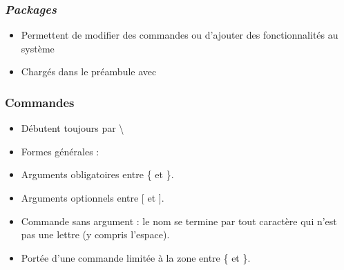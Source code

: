
\begin{frame}[c,fragile]

	\frametitle{\emph{Packages}}
	
	\begin{itemize}
		\item Permettent de modifier des commandes ou d’ajouter des	fonctionnalités au système
		\item Chargés dans le préambule avec
		
	\begin{codesource}
	\usepackage{package}
	\usepackage[options]{package}
	\usepackage{package1,package2,...}
	\end{codesource}
	\end{itemize}
\end{frame}


\begin{frame}[fragile]

	\frametitle{Commandes}
	
	\begin{itemize}
		\item Débutent toujours par \textbackslash
		\item Formes générales : 
			
	\begin{codesource}
	\nomcommande
	\end{codesource}
					
		\item Arguments obligatoires entre \{  et \}.
		\item Arguments optionnels entre [ et ].
		\item Commande sans argument : le nom se termine par tout caractère	qui n’est pas une lettre (y compris l’espace).
		\item Portée d’une commande limitée à la zone entre \{  et \}.
	\end{itemize}

\end{frame}


